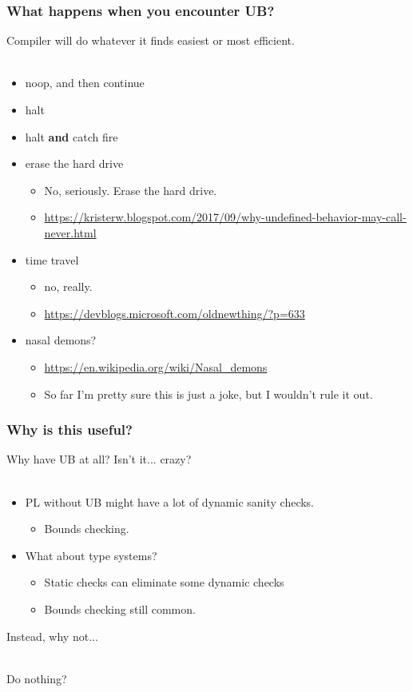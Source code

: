 \documentclass[handout]{beamer}
\begin{document}
\begin{frame}
  \frametitle{What happens when you encounter UB?}

  Compiler will do whatever it finds easiest or most efficient.\\~

  \begin{itemize}
  \item noop, and then continue
  \item halt
  \item halt {\bf and} catch fire
  \item erase the hard drive
    \pause
    \begin{itemize}
    \item No, seriously. Erase the hard drive.
    \item \url{https://kristerw.blogspot.com/2017/09/why-undefined-behavior-may-call-never.html}
    \end{itemize}
    \pause
  \item time travel
    \pause
    \begin{itemize}
    \item no, really.
    \item \url{https://devblogs.microsoft.com/oldnewthing/?p=633}
    \end{itemize}
    \pause
  \item nasal demons?
    \pause
    \begin{itemize}
    \item \url{https://en.wikipedia.org/wiki/Nasal\_demons}
      \pause
    \item So far I'm pretty sure this is just a joke, but I wouldn't
      rule it out.
    \end{itemize}
  \end{itemize}
\end{frame}

\begin{frame}
  \frametitle{Why is this useful?}

  Why have UB at all? Isn't it... {\tiny crazy?} \\~

  \pause

  \begin{itemize}
  \item PL without UB might have a lot of dynamic sanity checks.
    \begin{itemize}
    \item Bounds checking.
    \end{itemize}
    \pause
  \item What about type systems?
    \begin{itemize}
    \item Static checks can eliminate some dynamic checks
    \item Bounds checking still common.
    \end{itemize}
  \end{itemize}

  Instead, why not...\\~
  \pause

  Do nothing?
\end{frame}
\end{document}
